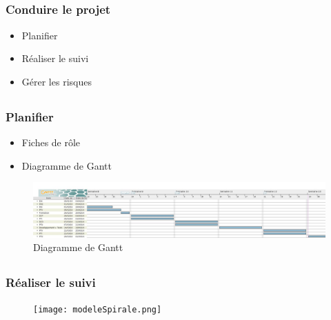 \subsection{} %

\begin{frame}
\frametitle{Conduire le projet}
	\begin{itemize}
		\item Planifier
		\item Réaliser le suivi
		\item Gérer les risques
	\end{itemize}
\end{frame}

\subsection{}

\begin{frame}
\frametitle{Planifier}
\begin{itemize}
	\item Fiches de rôle
	\item Diagramme de Gantt
\end{itemize}
\begin{figure}
	\includegraphics[scale=0.15]{images/exempleGantt.jpg}
	\caption{Diagramme de Gantt}
	\label{DG}
\end{figure}
\end{frame}

\subsection{}

\begin{frame}
\frametitle{Réaliser le suivi}
\begin{figure}
\texttt{[image: modeleSpirale.png]}
\end{figure}
\end{frame}